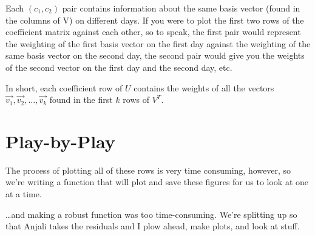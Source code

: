 \documentclass{article}
\begin{document}
Each $(c_{1},c_{2})$ pair contains information about the same basis
vector (found in the columns of V) on different days.  If you were to
plot the first two rows of the coefficient matrix against each other,
so to speak, the first pair would represent the weighting of the first
basis vector on the first day against the weighting of the same basis
vector on the second day, the second pair would give you the weights
of the second vector on the first day and the second day, etc.

In short, each coefficient row of $U$ contains the weights of all the
vectors $\vec{v_{1}}, \vec{v_{2}},\ldots,\vec{v_{k}}$ found in the
first $k$ rows of $V^{T}$.

\section{Play-by-Play}
\label{sec:procedure}

The process of plotting all of these rows is very time consuming,
however, so we're writing a function that will plot and save these
figures for us to look at one at a time.

\ldots and making a robust function was too time-consuming.  We're
splitting up so that Anjali takes the residuals and I plow ahead, make
plots, and look at stuff.
\end{document}
